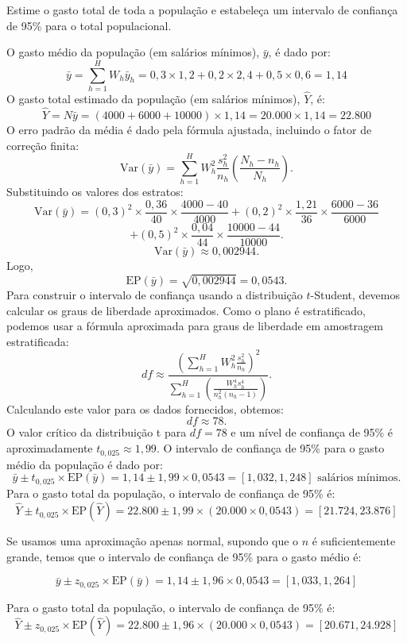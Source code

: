 \documentclass[a4paper,11pt,oneside,twocolumn]{Config/milktest}
\begin{document}
	Estime o  gasto total de toda a população e estabeleça um intervalo de confiança de 95\% para o total populacional.
	
	
	{\scriptsize
		
		O gasto médio da população (em salários mínimos), $\bar{y}$, é dado por:\[
		\bar{y} = \sum_{h=1}^{H} W_h \bar{y}_h = 0,3 \times 1,2 + 0,2 \times 2,4 + 0,5 \times 0,6 = 1,14
		\] 
		O gasto total estimado da população (em salários mínimos), $\hat{Y}$, é:
		\[
		\hat{Y} = N \bar{y} = (4000 + 6000 + 10000) \times 1,14 = 20.000 \times 1,14 = 22.800 
		\]
		O erro padrão da média é dado pela fórmula ajustada, incluindo o fator de correção finita:
		\[
		\text{Var}(\bar{y}) = \sum_{h=1}^{H} W_h^2 \frac{s_h^2}{n_h} \left(\frac{N_h - n_h}{N_h}\right).
		\]
		Substituindo os valores dos estratos:
		\[
		\text{Var}(\bar{y}) = (0,3)^2 \times \frac{0,36}{40} \times \frac{4000 - 40}{4000} + (0,2)^2 \times \frac{1,21}{36} \times \frac{6000 - 36}{6000} 
		\]
		\[+ (0,5)^2 \times \frac{0,04}{44} \times \frac{10000 - 44}{10000}.
		\]
		\[
		\text{Var}(\bar{y}) \approx 0,002944.
		\] Logo, 
		\[
		\text{EP}(\bar{y}) = \sqrt{0,002944} = 0,0543.
		\]
		Para construir o intervalo de confiança usando a distribuição $t$-Student, devemos calcular os graus de liberdade aproximados. Como o plano é estratificado, podemos usar a fórmula aproximada para graus de liberdade em amostragem estratificada:
		\[
		df \approx \frac{\left(\sum_{h=1}^{H} W_h^2 \frac{s_h^2}{n_h} \right)^2}{\sum_{h=1}^{H} \left(\frac{W_h^4 s_h^4}{n_h^2 (n_h - 1)}\right)}.
		\]
		Calculando este valor para os dados fornecidos, obtemos:
		\[
		df \approx 78.
		\]
		O valor crítico da distribuição t para $df = 78$ e um nível de confiança de 95\% é aproximadamente $t_{0,025} \approx 1,99$.
		O intervalo de confiança de 95\% para o gasto médio da população é dado por:
		\[
		\bar{y} \pm t_{0,025} \times \text{EP}(\bar{y}) = 1,14 \pm 1,99 \times 0,0543 = [1,032, 1,248] \text{ salários mínimos.}
		\]
		Para o gasto total da população, o intervalo de confiança de 95\% é:
		\[
		\hat{Y} \pm t_{0,025} \times \text{EP}(\hat{Y}) = 22.800 \pm 1,99 \times (20.000 \times 0,0543) = [21.724, 23.876] 
		\]
		
		Se usamos uma aproximação apenas normal, supondo que o $n$ é suficientemente grande, temos que o intervalo de confiança de 95\% para o gasto médio é:
		
		\[
		\bar{y} \pm z_{0,025} \times \text{EP}(\bar{y}) = 1,14 \pm 1,96 \times 0,0543 = [1,033, 1,264] 
		\]
		
		Para o gasto total da população, o intervalo de confiança de 95\% é:
		\[
		\hat{Y} \pm z_{0,025} \times \text{EP}(\hat{Y}) = 22.800 \pm 1,96 \times (20.000 \times 0,0543) = [20.671, 24.928] 
		\]
	}
	
	
	
	\bigskip
	
	
	\centering\color{cor}{\scshape boa prova}
	
	
\end{document}
